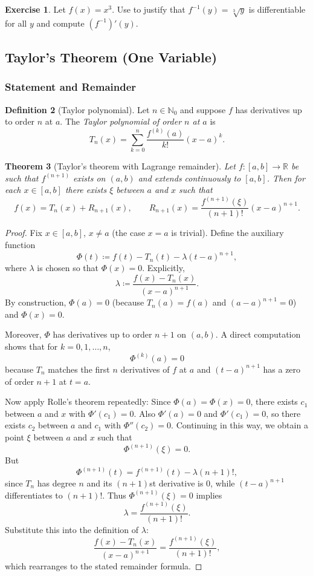 \documentclass[12pt]{article}
\numberwithin{equation}{section}
\newcommand{\RR}{\mathbb{R}}
\newcommand{\NN}{\mathbb{N}}
\theoremstyle{plain}
\newtheorem{theorem}{Theorem}[section]
\theoremstyle{definition}
\newtheorem{definition}[theorem]{Definition}
\newtheorem{exercise}[theorem]{Exercise}
\theoremstyle{remark}
\begin{document}
\begin{exercise}
Let $f(x)=x^3$. Use  to justify that $f^{-1}(y)=\sqrt[3]{y}$ is differentiable for all $y$ and compute $(f^{-1})'(y)$.
\end{exercise}

\newpage

\subsection{Taylor's Theorem (One Variable)}

\subsubsection{Statement and Remainder}

\begin{definition}[Taylor polynomial]
Let $n\in\NN_0$ and suppose $f$ has derivatives up to order $n$ at $a$.
The \emph{Taylor polynomial of order $n$ at $a$} is
\[
T_n(x)=\sum_{k=0}^{n}\frac{f^{(k)}(a)}{k!}(x-a)^k.
\]
\end{definition}

\begin{theorem}[Taylor's theorem with Lagrange remainder]\label{thm:taylor}
Let $f:[a,b]\to\RR$ be such that $f^{(n+1)}$ exists on $(a,b)$ and extends continuously to $[a,b]$.
Then for each $x\in[a,b]$ there exists $\xi$ between $a$ and $x$ such that
\[
f(x)=T_n(x)+R_{n+1}(x),
\qquad
R_{n+1}(x)=\frac{f^{(n+1)}(\xi)}{(n+1)!}(x-a)^{n+1}.
\]
\end{theorem}

\begin{proof}
Fix $x\in[a,b]$, $x\neq a$ (the case $x=a$ is trivial).
Define the auxiliary function
\[
\Phi(t) \coloneqq f(t)-T_n(t)-\lambda (t-a)^{n+1},
\]
where $\lambda$ is chosen so that $\Phi(x)=0$.
Explicitly,
\[
\lambda \coloneqq \frac{f(x)-T_n(x)}{(x-a)^{n+1}}.
\]
By construction, $\Phi(a)=0$ (because $T_n(a)=f(a)$ and $(a-a)^{n+1}=0$) and $\Phi(x)=0$.

Moreover, $\Phi$ has derivatives up to order $n+1$ on $(a,b)$.
A direct computation shows that for $k=0,1,\dots,n$,
\[
\Phi^{(k)}(a)=0
\]
because $T_n$ matches the first $n$ derivatives of $f$ at $a$ and $(t-a)^{n+1}$ has a zero of order $n+1$ at $t=a$.

Now apply Rolle's theorem repeatedly:
Since $\Phi(a)=\Phi(x)=0$, there exists $c_1$ between $a$ and $x$ with $\Phi'(c_1)=0$.
Also $\Phi'(a)=0$ and $\Phi'(c_1)=0$, so there exists $c_2$ between $a$ and $c_1$ with $\Phi''(c_2)=0$.
Continuing in this way, we obtain a point $\xi$ between $a$ and $x$ such that
\[
\Phi^{(n+1)}(\xi)=0.
\]
But
\[
\Phi^{(n+1)}(t)=f^{(n+1)}(t)-\lambda (n+1)!,
\]
since $T_n$ has degree $n$ and its $(n+1)$st derivative is $0$, while $(t-a)^{n+1}$ differentiates to $(n+1)!$.
Thus $\Phi^{(n+1)}(\xi)=0$ implies
\[
\lambda=\frac{f^{(n+1)}(\xi)}{(n+1)!}.
\]
Substitute this into the definition of $\lambda$:
\[
\frac{f(x)-T_n(x)}{(x-a)^{n+1}}=\frac{f^{(n+1)}(\xi)}{(n+1)!},
\]
which rearranges to the stated remainder formula.
\end{proof}
\end{document}
